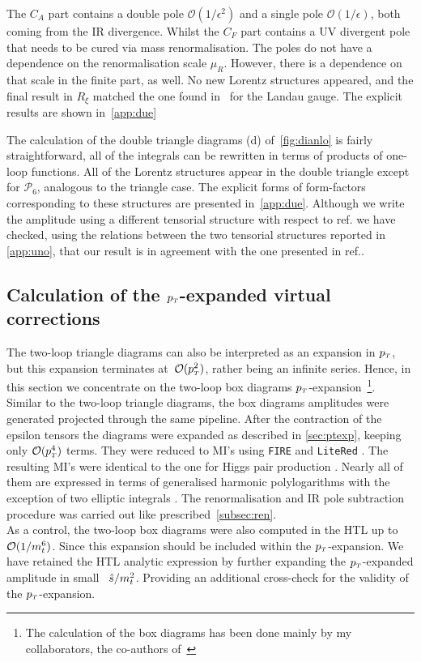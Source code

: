 The $C_A$ part contains a double pole $ \mathcal O( 1/\epsilon^2) $  and a single pole $ \mathcal O( 1/\epsilon) $, both  coming from the IR divergence. Whilst the $C_F$ part contains a UV divergent pole that needs to be cured via mass renormalisation. The poles do not have a dependence on the renormalisation scale $ \mu_R$. However, there is a dependence on that scale in the finite part, as well.  No new Lorentz structures appeared, and the final result in $R_\xi$ matched the one found in~\cite{Spira:1995rr,Aglietti:2006tp} for the Landau gauge. The explicit results are shown in~\autoref{app:due}
%
\par  The calculation of the double triangle diagrams (d) of~\autoref{fig:dianlo} is fairly straightforward, all of the 
 integrals can be rewritten in terms of products of one-loop functions. All of the Lorentz structures appear in the double triangle except for $\mathcal{P}_6$, analogous to the triangle case. The explicit forms of form-factors corresponding to these structures are presented in~\autoref{app:due}. Although we write the amplitude using a different
tensorial structure with respect to ref.\cite{Davies:2020drs} we have checked,
using the relations between the two tensorial structures reported in 
\autoref{app:uno}, that our result is in agreement with the one presented
in ref.\cite{Hasselhuhn:2016rqt}.
\subsection{Calculation of the $p_{\scriptscriptstyle T}$-expanded virtual corrections}
\par The two-loop triangle diagrams can also be interpreted as an expansion in $p_{\scriptscriptstyle T}$, but this expansion terminates at~${\cal O}(p_{\scriptscriptstyle T}^2)$, rather being an infinite series. Hence, in this section we concentrate on the two-loop box diagrams $p_{\scriptscriptstyle T}$-expansion~\footnote{The calculation of the box diagrams has been done mainly by my collaborators, the co-authors of~\cite{Alasfar:2021ppe}}.\\
Similar to the two-loop triangle diagrams, the box diagrams amplitudes were generated projected through the same pipeline. After the contraction of the epsilon tensors the diagrams were expanded as
described in \autoref{sec:ptexp}, keeping only ${\cal O}(p_{\scriptscriptstyle T}^4)$ terms. They were reduced to MI's
using \texttt{FIRE} \cite{Smirnov:2014hma} and \texttt{LiteRed} \cite{Lee:2013mka}. The
resulting MI's were identical to the one for Higgs pair
production \cite{Bonciani:2018omm}. Nearly all of them are expressed
in terms of generalised harmonic polylogarithms with the exception of
two elliptic integrals \cite{vonManteuffel:2017hms, Bonciani:2018uvv}. The renormalisation and IR pole subtraction procedure was carried out like prescribed~\autoref{subsec:ren}.\\
As a control, the two-loop box diagrams were also computed in the HTL up to  $\mathcal{O}(1/m_t^6)$. Since this expansion should be included within the $p_{\scriptscriptstyle T}$-expansion. We have retained the HTL analytic expression by further expanding the $p_{\scriptscriptstyle T}$-expanded amplitude in small ~$\hat{s}/m_t^2$. Providing an additional cross-check for the validity of the $p_{\scriptscriptstyle T}$-expansion.
